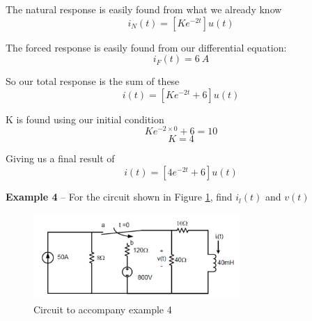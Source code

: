 \documentclass{handout}
\begin{document}
{The natural response is easily found from what we already know
\[
i_N(t) = \left[Ke^{-2t}\right]u(t)
\]

The forced response is easily found from our differential equation:
\[
i_F(t) = 6\ A
\]

So our total response is the sum of these
\[
i(t) = \left[Ke^{-2t} + 6\right]u(t)
\]

K is found using our initial condition
\[
Ke^{-2 \times 0} + 6 =10
\]
\[
K=4
\]

Giving us a final result of
\[
i(t) = \left[4e^{-2t} + 6\right]u(t)
\]
}

\newpage
\clearpage
\pagebreak

\textbf{Example 4} -- For the circuit shown in Figure \ref{fig: Example4}, find $i_l(t)$ and $v(t)$

\begin{figure} [h!]
\centering
\includegraphics[width=0.7\textwidth]{Example4.jpg}
\caption{Circuit to accompany example 4}
\label{fig: Example4}
\end{figure}
 
\end{document}
